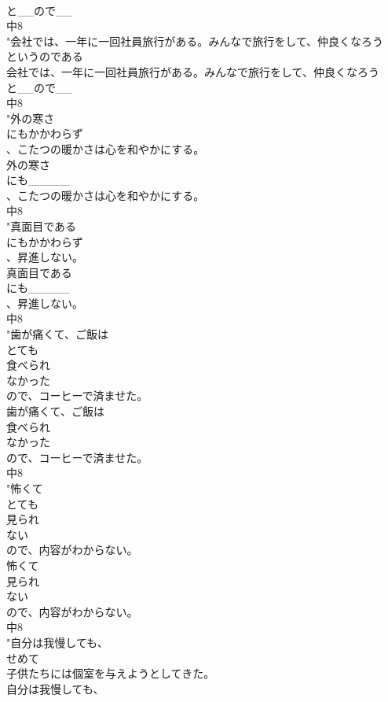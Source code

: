 \documentclass[8pt]{extreport}
\begin{document}
\begin{CJK}{UTF8}{min}
\\	と__ので__
\\	中8
\\	"会社では、一年に一回社員旅行がある。みんなで旅行をして、仲良くなろう
\\	というのである
\\	会社では、一年に一回社員旅行がある。みんなで旅行をして、仲良くなろう
\\	と__ので__
\\	中8
\\	"外の寒さ
\\	にもかかわらず
\\	、こたつの暖かさは心を和やかにする。
\\	外の寒さ
\\	にも_____
\\	、こたつの暖かさは心を和やかにする。
\\	中8
\\	"真面目である
\\	にもかかわらず
\\	、昇進しない。
\\	真面目である
\\	にも_____
\\	、昇進しない。
\\	中8
\\	"歯が痛くて、ご飯は
\\	とても
\\	食べられ
\\	なかった
\\	ので、コーヒーで済ませた。
\\	歯が痛くて、ご飯は
\\	食べられ
\\	なかった
\\	ので、コーヒーで済ませた。
\\	中8
\\	"怖くて
\\	とても
\\	見られ
\\	ない
\\	ので、内容がわからない。
\\	怖くて
\\	見られ
\\	ない
\\	ので、内容がわからない。
\\	中8
\\	"自分は我慢しても、
\\	せめて
\\	子供たちには個室を与えようとしてきた。
\\	自分は我慢しても、

\end{CJK}
\end{document}
